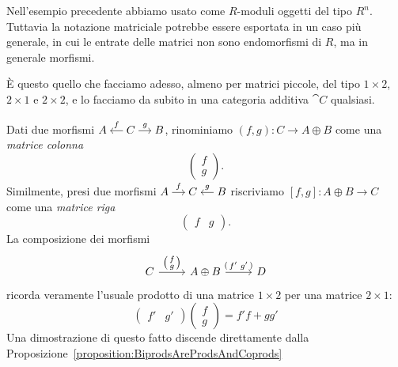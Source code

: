 Nell'esempio precedente abbiamo usato come \(R\)-moduli oggetti del tipo
\(R^n\). Tuttavia la notazione matriciale potrebbe essere esportata in
un caso più generale, in cui le entrate delle matrici non sono
endomorfismi di \(R\), ma in generale morfismi.

È questo quello che facciamo adesso, almeno per matrici piccole, del
tipo \(1 \times 2\), \(2 \times 1\) e \(2 \times 2\), e lo facciamo da
subito in una categoria additiva \(\cat C\) qualsiasi.

Dati due morfismi
\(\begin{tikzcd}[column sep=small, cramped] A & C \ar["{f}", l, swap]
  \ar["{g}", r] & B
\end{tikzcd}\), rinominiamo \((f, g) : C \to A \oplus B\) come una {\em
  matrice colonna}
\[
  \begin{pmatrix}
    f \\
    g
  \end{pmatrix} .
\]
Similmente, presi due morfismi
\(\begin{tikzcd}[column sep=small, cramped] A \ar["{f}", r] & C & B
  \ar["{g}", l, swap]
\end{tikzcd}\) riscriviamo \([f, g] : A \oplus B \to C\) come una {\em
  matrice riga}
\[
  \begin{pmatrix}
    f & g
  \end{pmatrix} .
\]
La composizione dei morfismi
\[
  \begin{tikzcd}[ampersand replacement=\&]
    C \ar["{\begin{psmallmatrix} f \\ g \end{psmallmatrix}}", r] \& A
    \oplus B \ar["{\begin{psmallmatrix} f' & g' \end{psmallmatrix}}", r]
    \& D
  \end{tikzcd}
\]
ricorda veramente l'usuale prodotto di una matrice \(1 \times 2\) per
una matrice \(2 \times 1\):
\[
  \begin{pmatrix}
    f' & g'
  \end{pmatrix} \begin{pmatrix}
    f \\ g
  \end{pmatrix}
  = f' f + g g'
\]
Una dimostrazione di questo fatto discende direttamente dalla
Proposizione~\ref{proposition:BiprodsAreProdsAndCoprods}

